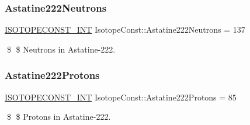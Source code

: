 \subsubsection{\texorpdfstring{Astatine222\+Neutrons}{Astatine222Neutrons}}
{\footnotesize\ttfamily \mbox{\hyperlink{group___isotope_const-_macros_ga5f18360b3e99483a35c32d789e62621c}{I\+S\+O\+T\+O\+P\+E\+C\+O\+N\+S\+T\+\_\+\+I\+NT}} Isotope\+Const\+::\+Astatine222\+Neutrons = 137}

\$ \$ Neutrons in Astatine-\/222. \mbox{\label{group___isotope_const-_astatine-_at222_ga7419970ca4d12fc7d63d1f4f1c174faa}} 
\subsubsection{\texorpdfstring{Astatine222\+Protons}{Astatine222Protons}}
{\footnotesize\ttfamily \mbox{\hyperlink{group___isotope_const-_macros_ga5f18360b3e99483a35c32d789e62621c}{I\+S\+O\+T\+O\+P\+E\+C\+O\+N\+S\+T\+\_\+\+I\+NT}} Isotope\+Const\+::\+Astatine222\+Protons = 85}

\$ \$ Protons in Astatine-\/222. 